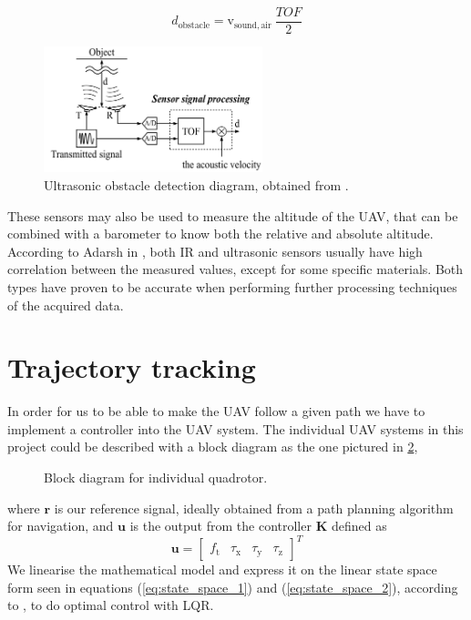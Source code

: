 \documentclass[journal, twoside]{IEEEtran}
\newcommand*{\subb}[1]{_{\mathrm{#1}}}
\begin{document}
	\begin{equation} \label{eq:ultrasonic_formula}
	d\subb{obstacle} = \textrm{v}\subb{sound, air} \ \frac{TOF}{2}
	\end{equation}
	\begin{figure}[h]
		\centering
		\includegraphics[width=2.5in]{ultrasonic2}
		\caption{Ultrasonic obstacle detection diagram, obtained from \cite{hirata2008cross}.}
		\label{fig:ultrasonic}
	\end{figure}
	
	These sensors may also be used to measure the altitude of the UAV, that can be combined with a barometer to know both the relative and absolute altitude. According to Adarsh in \cite{AdarshS2016PcoI}, both IR and ultrasonic sensors usually have high correlation between the measured values, except for some specific materials. Both types have proven to be accurate when performing further processing techniques of the acquired data.
	
	
	\section{Trajectory tracking}
	In order for us to be able to make the UAV follow a given path we have to implement a controller into the UAV system. The individual UAV systems in this project could be described with a block diagram as the one pictured in \figurename{\ref{fig:block_diagram}},
	\begin{figure}[h]
		\centering
		
		\caption{Block diagram for individual quadrotor.}
		\label{fig:block_diagram}
	\end{figure}	
	where $\bm{r}$ is our reference signal, ideally obtained from a path planning algorithm for navigation, and $\bm{u}$ is the output from the controller $\bm{K}$ defined as
	\begin{equation} \label{eq:uvect}
		\bm{u} = \left[ {\begin{array}{cccc}	
    f\subb{t} & \tau\subb{x} & \tau\subb{y} & \tau\subb{z}
	\end{array} } \right]^T
	\end{equation}
	 We linearise the mathematical model and express it on the linear state space form seen in equations (\ref{eq:state_space_1}) and (\ref{eq:state_space_2}), according to \cite{SabatinoFrancesco2015Qcmn},  to do optimal control with LQR.
\end{document}
